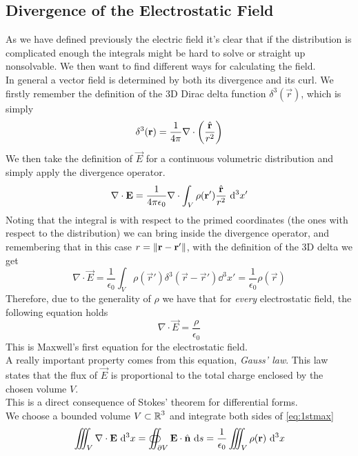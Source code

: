 \documentclass[../electromagnetism]{subfiles}
\begin{document}
\subsection{Divergence of the Electrostatic Field}
As we have defined previously the electric field it's clear that if the distribution is complicated enough the integrals might be hard to solve or straight up nonsolvable. We then want to find different ways for calculating the field.\\
In general a vector field is determined by both its divergence and its curl. We firstly remember the definition of the 3D Dirac delta function $\delta^3(\vec{r})$, which is simply
\begin{equation}
	\delta^3(\mathbf{r})=\frac{1}{4\pi}\nabla\cdot\left( \frac{\hat{\mathbf{r}}}{r^2} \right)
	\label{eq:delta3r}
\end{equation}
We then take the definition of $\vec{E}$ for a continuous volumetric distribution and simply apply the divergence operator.
\begin{equation}
	\nabla\cdot\mathbf{E}=\frac{1}{4\pi\epsilon_0}\nabla\cdot\int_{V}^{}\rho(\mathbf{r}')\frac{\hat{\mathbf{r}}}{r^2}\ \mathrm{d}^3x'
	\label{eq:Ediv}
\end{equation}
Noting that the integral is with respect to the primed coordinates (the ones with respect to the distribution) we can bring inside the divergence operator, and remembering that in this case $r=\norm{\mathbf{r}-\mathbf{r}'}$, with the definition of the 3D delta we get
\begin{equation*}
	\nabla\cdot\vec{E}=\frac{1}{\epsilon_0}\int_{V}^{}\rho(\vec{r}')\delta^3(\vec{r}-\vec{r}')\dd^3x'=\frac{1}{\epsilon_0}\rho(\vec{r})
\end{equation*}
Therefore, due to the generality of $\rho$ we have that for \textit{every} electrostatic field, the following equation holds
\begin{equation}
	\nabla\cdot\vec{E}=\frac{\rho}{\epsilon_0}
	\label{eq:1stmax}
\end{equation}
This is Maxwell's first equation for the electrostatic field.\\
A really important property comes from this equation, \textit{Gauss' law}. This law states that the flux of $\vec{E}$ is proportional to the total charge enclosed by the chosen volume $V$.\\
This is a direct consequence of Stokes' theorem for differential forms.\\
We choose a bounded volume $V\subset\operatorname{\mathbb{R}}^3$ and integrate both sides of \eqref{eq:1stmax}
\begin{equation*}
	\iiint_V\nabla\cdot\mathbf{E}\ \mathrm{d}^3x=\oiint_{\partial V}\mathbf{E}\cdot\hat{\mathbf{n}}\ \mathrm{d} s=\frac{1}{\epsilon_0}\iiint_V\rho(\mathbf{r})\ \mathrm{d}^3x
\end{equation*}
\end{document}
